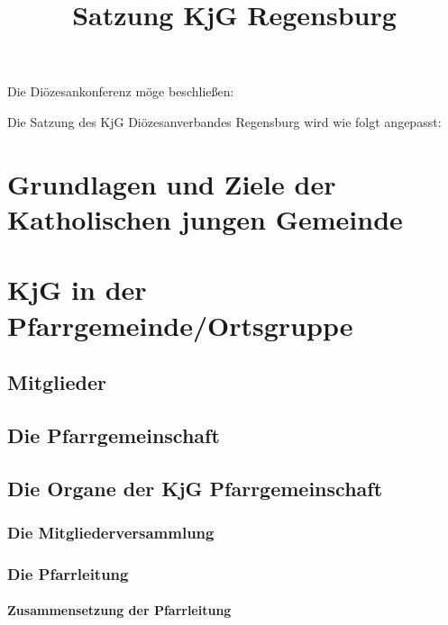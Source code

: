 \documentclass[12pt]{report}
\title{Satzung KjG Regensburg}
\author{}
\begin{document}
  \setcounter{page}{1}


\begin{flushleft}
Die Diözesankonferenz möge beschließen:

Die Satzung des KjG Diözesanverbandes Regensburg wird wie folgt angepasst:
\chapter{Grundlagen und Ziele der Katholischen jungen Gemeinde}

\chapter{KjG in der Pfarrgemeinde/Ortsgruppe}
\section{Mitglieder}

\section{Die Pfarrgemeinschaft}

\section{Die Organe der KjG Pfarrgemeinschaft}
\subsection{Die Mitgliederversammlung}
\subsection{Die Pfarrleitung}
\subsubsection{Zusammensetzung der Pfarrleitung}


\end{flushleft}
\end{document}
